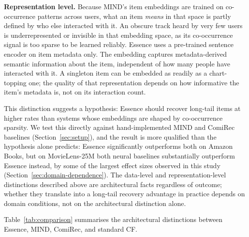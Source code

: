 \documentclass[11pt,a4paper]{article}
\begin{document}
\textbf{Representation level.} Because MIND's item embeddings are trained on
co-occurrence patterns across users, what an item \emph{means} in that space
is partly defined by who else interacted with it. An obscure track heard by very few
users is underrepresented or invisible in that embedding space, as its
co-occurrence signal is too sparse to be learned reliably. Essence uses a
pre-trained sentence encoder on item metadata only. The embedding captures metadata-derived semantic information about the item,
independent of how many people have interacted with it. A singleton item can
be embedded as readily as a chart-topping one; the quality of that
representation depends on how informative the item's metadata is, not on its
interaction count.

This distinction suggests a hypothesis: Essence should recover long-tail
items at higher rates than systems whose embeddings are shaped by
co-occurrence sparsity. We test this directly against hand-implemented
MIND and ComiRec baselines (Section~\ref{sec:setup}), and the result is
more qualified than the hypothesis alone predicts: Essence significantly
outperforms both on Amazon Books, but on MovieLens-25M both neural
baselines substantially outperform Essence instead, by some of the
largest effect sizes observed in this study
(Section~\ref{sec:domain-dependence}). The data-level and
representation-level distinctions described above are architectural facts
regardless of outcome; whether they translate into a long-tail recovery
advantage in practice depends on domain conditions, not on the
architectural distinction alone.

Table~\ref{tab:comparison} summarises the architectural distinctions between
Essence, MIND, ComiRec, and standard CF.
\end{document}
